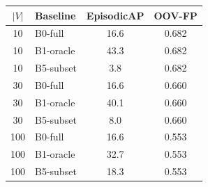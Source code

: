 \begin{tabular}{c l cc}
\toprule
$|V|$ & Baseline & EpisodicAP & OOV-FP \\
\midrule
10 & B0-full & 16.6 & 0.682 \\
10 & B1-oracle & 43.3 & 0.682 \\
10 & B5-subset & 3.8 & 0.682 \\
30 & B0-full & 16.6 & 0.660 \\
30 & B1-oracle & 40.1 & 0.660 \\
30 & B5-subset & 8.0 & 0.660 \\
100 & B0-full & 16.6 & 0.553 \\
100 & B1-oracle & 32.7 & 0.553 \\
100 & B5-subset & 18.3 & 0.553 \\
\bottomrule
\end{tabular}
